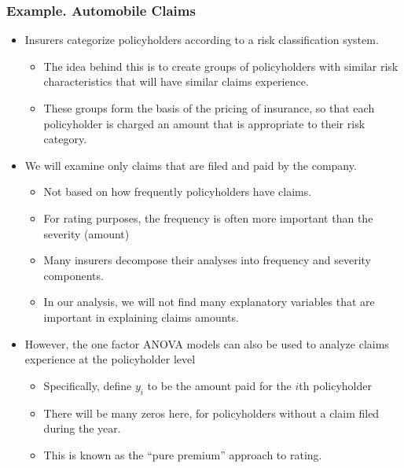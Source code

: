 \begin{frame}[shrink=2]
 \frametitle{Example. Automobile Claims}
   \begin{itemize}
    \item Insurers categorize policyholders according to a risk
    classification system.
      \begin{itemize}
    \item The idea behind this is to create groups of policyholders
    with similar risk characteristics that will have similar claims
    experience.
    \item These groups form the basis of the pricing of insurance,
    so that each policyholder is charged an amount that is
    appropriate to their risk category.
  \end{itemize}
\item We will examine only claims that are filed and paid by the
company.
\begin{itemize}
    \item Not based on how frequently
    policyholders have claims.
    \item For rating purposes, the frequency is often more important
    than the severity (amount)
    \item Many insurers decompose their analyses into frequency and
    severity components.
    \item In our analysis, we will not find many explanatory
    variables that are important in explaining claims amounts.
   \end{itemize}
\item However, the one factor ANOVA models can also be used to
analyze claims experience at the policyholder level
\begin{itemize}
    \item Specifically, define $y_i$ to be the amount paid for the
    $i$th policyholder
    \item There will be many zeros here, for policyholders without a
    claim filed during the year.
    \item This is known as the ``pure premium'' approach to rating.
    \end{itemize}
       \end{itemize}
\end{frame}

